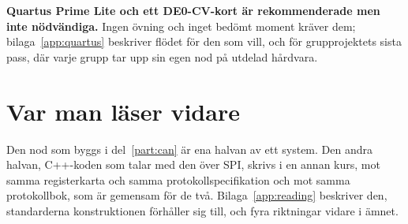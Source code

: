 \textbf{Quartus Prime Lite och ett DE0-CV-kort är rekommenderade men inte nödvändiga.} Ingen
övning och inget bedömt moment kräver dem; bilaga~\ref{app:quartus} beskriver flödet för den som
vill, och för grupprojektets sista pass, där varje grupp tar upp sin egen nod på utdelad hårdvara.

\section*{Var man läser vidare}
Den nod som byggs i del~\ref{part:can} är ena halvan av ett system. Den andra halvan, C++-koden
som talar med den över SPI, skrivs i en annan kurs, mot samma registerkarta och samma
protokollspecifikation \textemdash{} och mot samma protokollbok, som är gemensam för de två.
Bilaga~\ref{app:reading} beskriver den, standarderna konstruktionen förhåller sig till, och fyra
riktningar vidare i ämnet.
